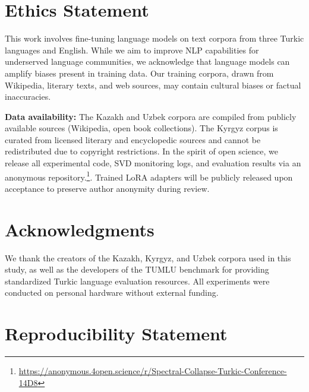 \documentclass[11pt]{article}
\begin{document}
\section*{Ethics Statement}

This work involves fine-tuning language models on text corpora from three Turkic languages and English. While we aim to improve NLP capabilities for underserved language communities, we acknowledge that language models can amplify biases present in training data. Our training corpora, drawn from Wikipedia, literary texts, and web sources, may contain cultural biases or factual inaccuracies.

\textbf{Data availability:} The Kazakh and Uzbek corpora are compiled from publicly available sources (Wikipedia, open book collections). The Kyrgyz corpus is curated from licensed literary and encyclopedic sources and cannot be redistributed due to copyright restrictions. In the spirit of open science, we release all experimental code, SVD monitoring logs, and evaluation results via an anonymous repository.\footnote{\url{https://anonymous.4open.science/r/Spectral-Collapse-Turkic-Conference-14D8}}. Trained LoRA adapters will be publicly released upon acceptance to preserve author anonymity during review.

\section*{Acknowledgments}

We thank the creators of the Kazakh, Kyrgyz, and Uzbek corpora used in this study, as well as the developers of the TUMLU benchmark for providing standardized Turkic language evaluation resources. All experiments were conducted on personal hardware without external funding.

\section*{Reproducibility Statement}
\end{document}
